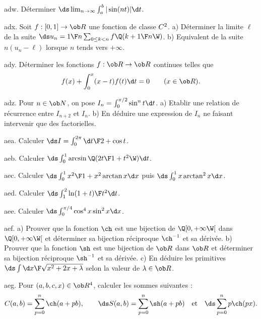 \exo [Level=1,Fight=2,Learn=2,Field=\Intégrales,Type=\Exercices,Origin=\MP] adw. 
 Déterminer $\ds\lim_{n\to\infty}\int_a^b|\sin (nt)|\d t$. 

\exo [Level=1,Fight=1,Learn=2,Field=\SommesDeRiemann,Type=\Exercices,Origin=\MP] adx. 
Soit $f:[0,1]\to\ob R$ une fonction de classe $\sc C^2$. \pn
a) Déterminer la limite $\ell$ de la suite $\ds u_n={1\F n}\sum_{0\le k< n}f\Q({k+1\F n}\W)$. \pn
b) Equivalent de la suite $n(u_n-\ell)$ lorsque $n$ tends vers $+\infty$. 
 
\exo [Level=1,Fight=2,Learn=1,Field=\Intégrales,Type=\Exercices,Origin=\MP]  ady. 
Déterminer les fonctions $f:\ob R\to\ob R$ continues telles que 
$$
f(x)+\int_0^x(x-t)f(t)\d t=0\qquad(x\in\ob R).
$$

\exo [Level=1,Fight=2,Learn=2,Field=\Intégrales,Type=\Exercices,Origin=]  adz. 
Pour $n\in\ob N$, on pose $I_n=\int_0^{\pi/2}\sin^nt\d t$. \pn
a) Etablir une relation de récurrence entre $I_{n+2}$ et $I_n$. \pn
b) En déduire une expression de $I_n$ ne faisant intervenir que des factorielles. 

\exo [Level=1,Fight=0,Learn=0,Field=\Intégrales,Type=\Exercices,Origin=]  aea. 
Calculer $\ds I=\int_0^{2\pi}{\d t\F2+\cos t}$. 

\exo [Level=1,Fight=1,Learn=0,Field=\Intégrales,Type=\Exercices,Origin=] aeb. 
Calculer $\ds \int_0^1\arcsin\Q({2t\F1+t^2}\W)\d t$. 

\exo [Level=1,Fight=2,Learn=1,Field=\Intégrales,Type=\Exercices,Origin=] aec. 
Calculer $\ds \int_0^1{x^2\F 1+x^2}\arctan x\d x$ puis $\ds\int_0^1x\arctan^2x\d x$. 

\exo [Level=1,Fight=1,Learn=0,Field=\Intégrales,Type=\Exercices,Origin=] aed. 
Calculer $\ds \int_1^2{\ln(1+t)\F t^2}\d t$. 

\exo [Level=1,Fight=0,Learn=0,Field=\Intégrales,Type=\Exercices,Origin=] aee. 
Calculer $\ds \int_0^{\pi/4}\cos^4x\sin^2x\d x$. 

\exo [Level=1,Fight=2,Learn=2,Field=\Fonctions,Type=\Cours,Origin=] aef. 
a) Prouver que la fonction $\ch$ est une bijection de $\Q[0,+\infty\W[$ dans $\Q[0,+\infty\W[$ 
et déterminer sa bijection réciproque $\ch^{-1}$ et sa dérivée. \pn
b) Prouver que la fonction $\sh$ est une bijection de $\ob R$ dans $\ob R$ et 
déterminer sa bijection réciproque $\sh^{-1}$ et sa dérivée.  \pn
c) En déduire les primitives $\ds \int{\d x\F\sqrt{x^2+2x+\lambda}}$ selon la valeur de $\lambda\in\ob R$. 

\exo [Level=1,Fight=0,Learn=0,Field=\TrigonométrieHyperbolique,Type=\Exercices,Origin=] aeg. 
Pour $(a,b,c,x)\in\ob R^4$, calculer les sommes suivantes : 
$$
C(a,b)=\sum_{p=0}^n\ch(a+pb), \qquad\ds S(a,b)=\sum_{p=0}^n\sh(a+pb)\quad\hbox{et}\quad
\ds \sum_{p=0}^np\ch(px).
$$ 

